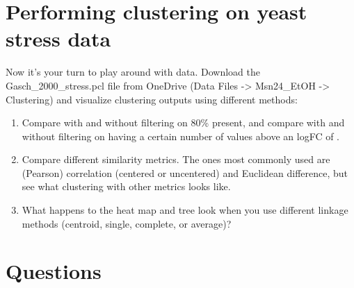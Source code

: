 \documentclass[
]{book}
\begin{document}
\hypertarget{performing-clustering-on-yeast-stress-data}{%
\section{Performing clustering on yeast stress data}\label{performing-clustering-on-yeast-stress-data}}

Now it's your turn to play around with data. Download the Gasch\_2000\_stress.pcl file from OneDrive (Data Files -\textgreater{} Msn24\_EtOH -\textgreater{} Clustering) and visualize clustering outputs using different methods:

\begin{enumerate}
\def\labelenumi{\arabic{enumi})}
\item
  Compare with and without filtering on 80\% present, and compare with and without filtering on having a certain number of values above an logFC of \textbar.
\item
  Compare different similarity metrics. The ones most commonly used are (Pearson) correlation (centered or uncentered) and Euclidean difference, but see what clustering with other metrics looks like.
\item
  What happens to the heat map and tree look when you use different linkage methods (centroid, single, complete, or average)?
\end{enumerate}

\hypertarget{questions-6}{%
\section{Questions}\label{questions-6}}
\end{document}

